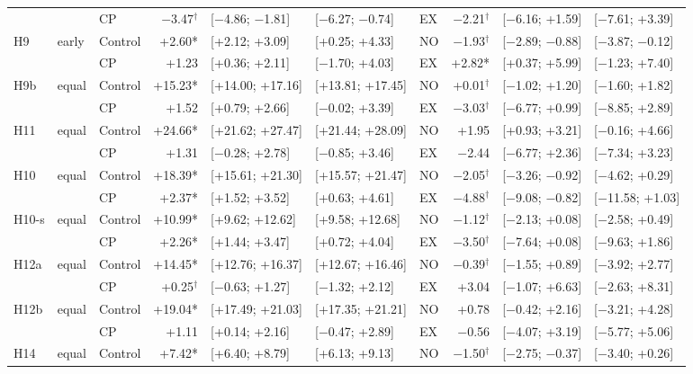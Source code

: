 \begin{table}[H]
{\begin{tabular}{@{}l l l r l l | l r l l@{}}
 & & CP & $-$3.47$^\dagger$ & [$-$4.86; $-$1.81] & [$-$6.27; $-$0.74] & EX & $-$2.21$^\dagger$ & [$-$6.16; +1.59] & [$-$7.61; +3.39] \\
H9 & early & Control & +2.60* & [+2.12; +3.09] & [+0.25; +4.33] & NO & $-$1.93$^\dagger$ & [$-$2.89; $-$0.88] & [$-$3.87; $-$0.12] \\
 & & CP & +1.23 & [+0.36; +2.11] & [$-$1.70; +4.03] & EX & +2.82* & [+0.37; +5.99] & [$-$1.23; +7.40] \\
H9b & equal & Control & +15.23* & [+14.00; +17.16] & [+13.81; +17.45] & NO & +0.01$^\dagger$ & [$-$1.02; +1.20] & [$-$1.60; +1.82] \\
 & & CP & +1.52 & [+0.79; +2.66] & [$-$0.02; +3.39] & EX & $-$3.03$^\dagger$ & [$-$6.77; +0.99] & [$-$8.85; +2.89] \\
H11 & equal & Control & +24.66* & [+21.62; +27.47] & [+21.44; +28.09] & NO & +1.95 & [+0.93; +3.21] & [$-$0.16; +4.66] \\
 & & CP & +1.31 & [$-$0.28; +2.78] & [$-$0.85; +3.46] & EX & $-$2.44 & [$-$6.77; +2.36] & [$-$7.34; +3.23] \\
H10 & equal & Control & +18.39* & [+15.61; +21.30] & [+15.57; +21.47] & NO & $-$2.05$^\dagger$ & [$-$3.26; $-$0.92] & [$-$4.62; +0.29] \\
 & & CP & +2.37* & [+1.52; +3.52] & [+0.63; +4.61] & EX & $-$4.88$^\dagger$ & [$-$9.08; $-$0.82] & [$-$11.58; +1.03] \\
H10-s & equal & Control & +10.99* & [+9.62; +12.62] & [+9.58; +12.68] & NO & $-$1.12$^\dagger$ & [$-$2.13; +0.08] & [$-$2.58; +0.49] \\
 & & CP & +2.26* & [+1.44; +3.47] & [+0.72; +4.04] & EX & $-$3.50$^\dagger$ & [$-$7.64; +0.08] & [$-$9.63; +1.86] \\
H12a & equal & Control & +14.45* & [+12.76; +16.37] & [+12.67; +16.46] & NO & $-$0.39$^\dagger$ & [$-$1.55; +0.89] & [$-$3.92; +2.77] \\
 & & CP & +0.25$^\dagger$ & [$-$0.63; +1.27] & [$-$1.32; +2.12] & EX & +3.04 & [$-$1.07; +6.63] & [$-$2.63; +8.31] \\
H12b & equal & Control & +19.04* & [+17.49; +21.03] & [+17.35; +21.21] & NO & +0.78 & [$-$0.42; +2.16] & [$-$3.21; +4.28] \\
 & & CP & +1.11 & [+0.14; +2.16] & [$-$0.47; +2.89] & EX & $-$0.56 & [$-$4.07; +3.19] & [$-$5.77; +5.06] \\
H14 & equal & Control & +7.42* & [+6.40; +8.79] & [+6.13; +9.13] & NO & $-$1.50$^\dagger$ & [$-$2.75; $-$0.37] & [$-$3.40; +0.26] \\

\end{tabular}}
\end{table}
